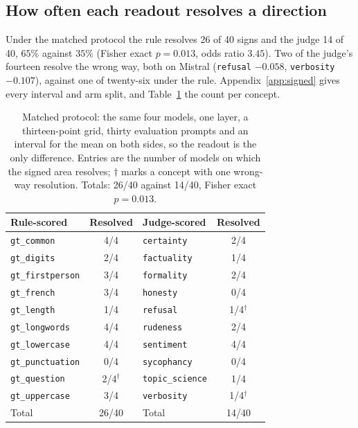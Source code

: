 \documentclass{article}
\begin{document}
\subsection{How often each readout resolves a direction}
\label{sec:directional}

Under the matched protocol the rule resolves 26 of 40 signs and the judge 14 of
40, $65\%$ against $35\%$ (Fisher exact $p=0.013$, odds ratio $3.45$). Two of
the judge's fourteen resolve the wrong way, both on Mistral (\texttt{refusal}
$-0.058$, \texttt{verbosity} $-0.107$), against one of twenty-six under the rule.
Appendix~\ref{app:signed} gives every interval and arm split, and
Table~\ref{tab:matched} the count per concept.

\begin{table}[tb]
  \caption{Matched protocol: the same four models, one layer, a thirteen-point grid, thirty evaluation prompts and an interval for the mean on both sides, so the readout is the only difference. Entries are the number of models on which the signed area resolves; $\dagger$ marks a concept with one wrong-way resolution. Totals: 26/40 against 14/40, Fisher exact $p=0.013$.}
  \label{tab:matched}
  \centering
  \footnotesize
  \begin{tabular}{lclc}
    \toprule
    Rule-scored & Resolved & Judge-scored & Resolved \\
    \midrule
    \texttt{gt\_common} & 4/4 & \texttt{certainty} & 2/4 \\
    \texttt{gt\_digits} & 2/4 & \texttt{factuality} & 1/4 \\
    \texttt{gt\_firstperson} & 3/4 & \texttt{formality} & 2/4 \\
    \texttt{gt\_french} & 3/4 & \texttt{honesty} & 0/4 \\
    \texttt{gt\_length} & 1/4 & \texttt{refusal} & 1/4$^{\dagger}$ \\
    \texttt{gt\_longwords} & 4/4 & \texttt{rudeness} & 2/4 \\
    \texttt{gt\_lowercase} & 4/4 & \texttt{sentiment} & 4/4 \\
    \texttt{gt\_punctuation} & 0/4 & \texttt{sycophancy} & 0/4 \\
    \texttt{gt\_question} & 2/4$^{\dagger}$ & \texttt{topic\_science} & 1/4 \\
    \texttt{gt\_uppercase} & 3/4 & \texttt{verbosity} & 1/4$^{\dagger}$ \\
    \midrule
    Total & 26/40 & Total & 14/40 \\
    \bottomrule
  \end{tabular}
\end{table}
\end{document}
